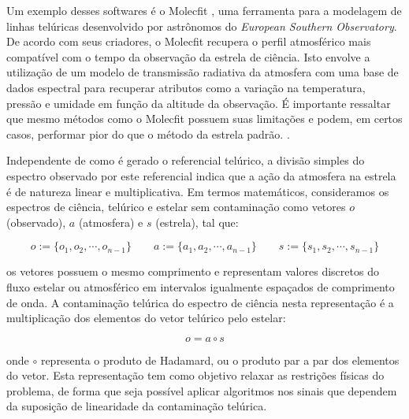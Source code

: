 Um exemplo desses softwares é o Molecfit \citep{smette2015molecfit}, uma ferramenta para a modelagem de linhas telúricas desenvolvido por astrônomos do \textit{European Southern Observatory}. De acordo com seus criadores, o Molecfit recupera o perfil atmosférico mais compatível com o tempo da observação da estrela de ciência. Isto envolve a utilização de um modelo de transmissão radiativa da atmosfera com uma base de dados espectral para recuperar atributos como a variação na temperatura, pressão e umidade em função da altitude da observação. É importante ressaltar que mesmo métodos como o Molecfit possuem suas limitações e podem, em certos casos, performar pior do que o método da estrela padrão. .

Independente de como é gerado o referencial telúrico, 
a divisão simples do espectro observado por este referencial indica que a ação da atmosfera na estrela é de natureza linear e multiplicativa.  Em termos matemáticos, consideramos os espectros de ciência, telúrico e estelar sem contaminação como vetores $o$ (observado), $a$ (atmosfera) e $s$ (estrela), tal que:

\begin{equation*}
    o := \{o_1, o_2, \cdots, o_{n-1}\} \qquad a := \{a_1, a_2, \cdots, a_{n-1}\} \qquad s := \{s_1, s_2, \cdots, s_{n-1}\} 
\end{equation*}


\noindent {}os vetores possuem o mesmo comprimento e representam valores discretos do fluxo estelar ou atmosférico em intervalos igualmente espaçados de comprimento de onda. A contaminação telúrica do espectro de ciência nesta representação é a multiplicação dos elementos do vetor telúrico pelo estelar:

\begin{equation*}
    o = a \circ s
\end{equation*}

\noindent onde $\circ$ representa o produto de Hadamard, ou o produto par a par dos elementos do vetor. Esta representação tem como objetivo relaxar as restrições físicas do problema, de forma que seja possível aplicar algoritmos nos sinais que dependem da suposição de linearidade da contaminação telúrica.


